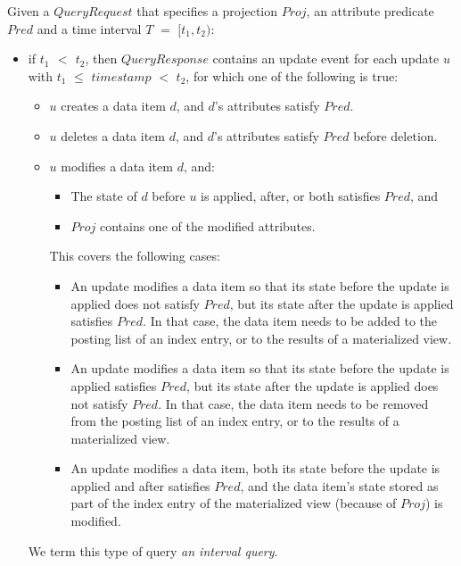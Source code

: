\noindent
Given a $QueryRequest$ that specifies a projection $Proj$,
an attribute predicate $Pred$
and a time interval $T$ $=$ $[t_1, t_2)$:
\begin{itemize}

  \item if \textbf{$t_1$ $<$ $t_2$},
  then $QueryResponse$ contains an update event for each update $u$ with $t_1$ $\leq$ $timestamp$ $<$ $t_2$,
  for which one of the following is true:
  \begin{itemize}
    \item $u$ creates a data item $d$, and $d$'s attributes satisfy $Pred$.

    \item $u$ deletes a data item $d$, and $d$'s attributes satisfy $Pred$ before deletion.

    \item $u$ modifies a data item $d$, and:
    \begin{itemize}
      \item The state of $d$ before $u$ is applied, after, or both satisfies $Pred$, and
      \item $Proj$ contains one of the modified attributes.
    \end{itemize}

    This covers the following cases:
    \begin{itemize}
      \item An update modifies a data item so that its state before the update is applied does not satisfy $Pred$,
      but its state after the update is applied satisfies $Pred$.
      In that case, the data item needs to be added to the posting list of an index entry, or to the results of a
      materialized view.

      \item An update modifies a data item so that its state before the update is applied satisfies $Pred$,
      but its state after the update is applied does not satisfy $Pred$.
      In that case, the data item needs to be removed from the posting list of an index entry, or to the results of a
      materialized view.

      \item An update modifies a data item, both its state before the update is applied and after satisfies $Pred$,
      and the data item's state stored as part of the index entry of the materialized view (because of $Proj$) is modified.
    \end{itemize}
  \end{itemize}
  We term this type of query \textit{an interval query}.


\end{itemize}
